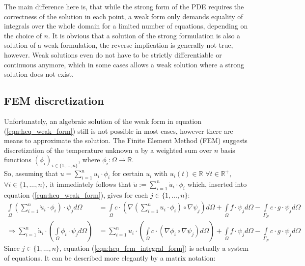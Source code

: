 \documentclass{IOS-Book-Article}
\theoremstyle{plain}
\theoremstyle{definition}
\begin{document}
The main difference here is, that while the strong form of the PDE requires the correctness of the solution in each point, a weak form only demands equality of integrals over the whole domain for a limited number of equations, depending on the choice of $n$.
It is obvious that a solution of the strong formulation is also a solution of a weak formulation, the reverse implication is generally not true, however. Weak solutions even do not have to be strictly differentiable or continuous anymore, which in some cases allows a weak solution where a strong solution does not exist.

\subsection{FEM discretization}

Unfortunately, an algebraic solution of the weak form in equation (\ref{eqn:heq_weak_form}) still is not possible in most cases, however there are means to approximate the solution.
The Finite Element Method (FEM) suggests discretization of the temperature unknown $u$ by a weighted sum over $n$ basis functions $(\phi_i)_{i \in \{1, \dots , n\}}$, where $\phi_i : \Omega \rightarrow \mathbb{R}$.\\
So, assuming that $u = \sum \limits_{i = 1}^{n} u_i \cdot \phi_i$ for certain $u_i$ with $u_i(t) \in \mathbb{R}$ $\forall t \in \mathbb{R}^{+}$, $\forall i \in \{1, \dots , n\}$, it immediately follows that $\dot u := \sum \limits_{i = 1}^{n} \dot u_i \cdot \phi_i$ which, inserted into equation (\ref{eqn:heq_weak_form}), gives for each $j \in \{1, \dots , n\}$:
\begin{align}
	\int \limits_{\Omega} (\sum \limits_{i = 1}^{n} \dot u_i \cdot \phi_i) \cdot \psi_j d\Omega &= \int \limits_{\Omega} c \cdot (\nabla (\sum \limits_{i = 1}^{n} u_i \cdot \phi_i) \circ \nabla \psi_j) d\Omega + \int 
	\limits_{\Omega} f \cdot \psi_j d\Omega - \int \limits_{\Gamma_N} c \cdot g \cdot \psi_j d\Omega \\
	\Rightarrow \sum \limits_{i = 1}^{n} \dot u_i \cdot \left( \int \limits_{\Omega} \phi_i \cdot \psi_j d\Omega \right) &= \sum \limits_{i = 1}^{n} u_i \cdot \left( \int \limits_{\Omega} c \cdot (\nabla \phi_i \circ \nabla \psi_j) d\Omega \right) + \int \limits_{\Omega} f \cdot \psi_j d\Omega - \int \limits_{\Gamma_N} c \cdot g \cdot \psi_j d\Omega
	\label{eqn:heq_fem_integral_form}
\end{align}
Since $j \in \{1, \dots , n\}$, equation (\ref{eqn:heq_fem_integral_form}) is actually a system of equations. It can be described more elegantly by a matrix notation:
\end{document}
